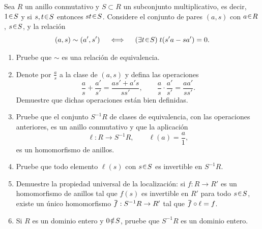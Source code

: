 \begin{ejer}
Sea $R$ un anillo conmutativo y $S \subset R$ un subconjunto multiplicativo, es decir, $1 \en S$ y si $s, t \en S$ entonces $st \en S$.
Considere el conjunto de pares $(a, s)$ con $a \en R$, $s \en S$, y la relación
\[
(a, s) \sim (a', s')%
\quad\iff\quad%
(\exists t \en S)\; t(s'a - sa') = 0.
\]
\begin{enumerate}[label=(\alph*)]
    \item Pruebe que $\sim$ es una relación de equivalencia.

    \item Denote por $\frac{a}{s}$ a la clase de $(a, s)$ y defina las operaciones
    \[
    \frac{a}{s} + \frac{a'}{s'} = \frac{as' + a's}{ss'},
    \qquad
    \frac{a}{s} \cdot \frac{a'}{s'} = \frac{aa'}{ss'}.
    \]
    Demuestre que dichas operaciones están bien definidas.

    \item Pruebe que el conjunto $S^{-1}R$ de clases de equivalencia, con las operaciones anteriores, es un anillo conmutativo y que la aplicación
    \[
    \ell : R \to S^{-1}R,
    \qquad
    \ell(a) = \frac{a}{1},
    \]
    es un homomorfismo de anillos.

    \item Pruebe que todo elemento $\ell(s)$ con $s \en S$ es invertible en $S^{-1}R$.

    \item Demuestre la propiedad universal de la localización: si $f : R \to R'$ es un homomorfismo de anillos tal que $f(s)$ es invertible en $R'$ para todo $s \en S$, existe un único homomorfismo
    $
    \ubar{f} : S^{-1}R \to R'
    $ 
    tal que $\ubar{f} \circ \ell = f$.

    \item Si $R$ es un dominio entero y $0 \noten S$, pruebe que $S^{-1}R$ es un dominio entero.
\end{enumerate}
\end{ejer}
